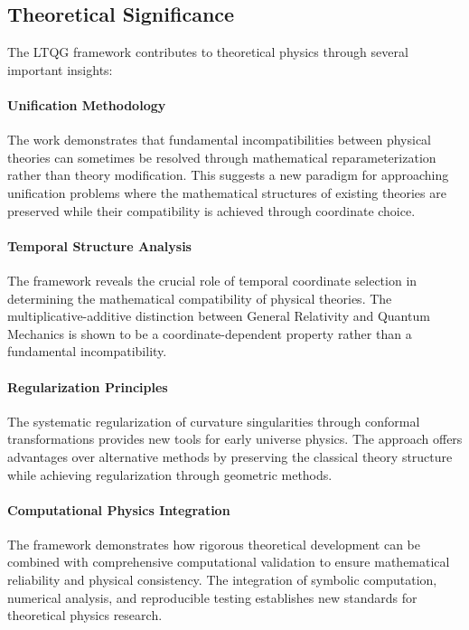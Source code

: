 \subsection{Theoretical Significance}
\label{subsec:theoretical_significance}

The LTQG framework contributes to theoretical physics through several important insights:

\paragraph{Unification Methodology} The work demonstrates that fundamental incompatibilities between physical theories can sometimes be resolved through mathematical reparameterization rather than theory modification. This suggests a new paradigm for approaching unification problems where the mathematical structures of existing theories are preserved while their compatibility is achieved through coordinate choice.

\paragraph{Temporal Structure Analysis} The framework reveals the crucial role of temporal coordinate selection in determining the mathematical compatibility of physical theories. The multiplicative-additive distinction between General Relativity and Quantum Mechanics is shown to be a coordinate-dependent property rather than a fundamental incompatibility.

\paragraph{Regularization Principles} The systematic regularization of curvature singularities through conformal transformations provides new tools for early universe physics. The approach offers advantages over alternative methods by preserving the classical theory structure while achieving regularization through geometric methods.

\paragraph{Computational Physics Integration} The framework demonstrates how rigorous theoretical development can be combined with comprehensive computational validation to ensure mathematical reliability and physical consistency. The integration of symbolic computation, numerical analysis, and reproducible testing establishes new standards for theoretical physics research.

